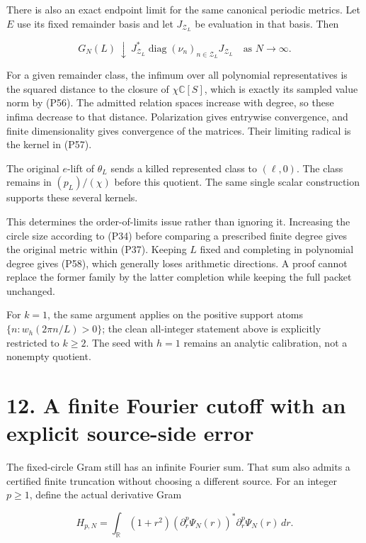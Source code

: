 \documentclass[
]{article}
\begin{document}
There is also an exact endpoint limit for the same canonical periodic
metrics. Let \(E\) use its fixed remainder basis and let
\(J_{\mathcal Z_L}\) be evaluation in that basis. Then

\[
\boxed{
G_N(L)\ \downarrow\
J_{\mathcal Z_L}^*\operatorname{diag}(\nu_n)_{n\in\mathcal Z_L}
J_{\mathcal Z_L}
\quad\text{as }N\to\infty.}
\tag{P58}
\]

For a given remainder class, the infimum over all polynomial
representatives is the squared distance to the closure of
\(\chi\mathbb C[S]\), which is exactly its sampled value norm by (P56).
The admitted relation spaces increase with degree, so these infima
decrease to that distance. Polarization gives entrywise convergence, and
finite dimensionality gives convergence of the matrices. Their limiting
radical is the kernel in (P57).

The original \(e\)-lift of \(\theta_L\) sends a killed represented class
to \((\ell,0)\). The class remains in \((p_L)/(\chi)\) before this
quotient. The same single scalar construction supports these several
kernels.

This determines the order-of-limits issue rather than ignoring it.
Increasing the circle size according to (P34) before comparing a
prescribed finite degree gives the original metric within (P37). Keeping
\(L\) fixed and completing in polynomial degree gives (P58), which
generally loses arithmetic directions. A proof cannot replace the former
family by the latter completion while keeping the full packet unchanged.

For \(k=1\), the same argument applies on the positive support atoms
\(\{n:w_h(2\pi n/L)>0\}\); the clean all-integer statement above is
explicitly restricted to \(k\ge2\). The seed with \(h=1\) remains an
analytic calibration, not a nonempty quotient.

\section{12. A finite Fourier cutoff with an explicit source-side
error}\label{a-finite-fourier-cutoff-with-an-explicit-source-side-error}

The fixed-circle Gram still has an infinite Fourier sum. That sum also
admits a certified finite truncation without choosing a different
source. For an integer \(p\ge1\), define the actual derivative Gram

\[
H_{p,N}=\int_{\mathbb R}(1+r^2)
(\partial_r^p\Psi_N(r))^*\partial_r^p\Psi_N(r)\,dr.
\tag{P59}
\]
\end{document}
